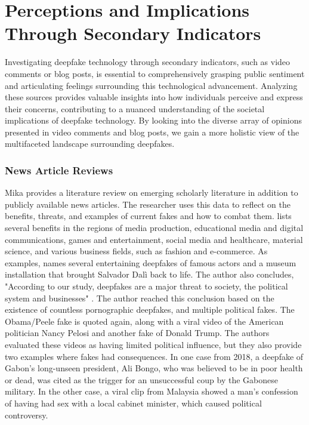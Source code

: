 \documentclass[
  a4paper,  %
  twoside,  %
  bibliography=totoc,
  headsepline,
  cleardoublepage=empty,
  parskip=half,
  draft=false
]{scrbook}
\begin{document}
\section{Perceptions and Implications Through Secondary Indicators} 
\label{sec:rel-secondary}

Investigating deepfake technology through secondary indicators, such as video comments or blog posts, is essential to comprehensively grasping public sentiment and articulating feelings surrounding this technological advancement. Analyzing these sources provides valuable insights into how individuals perceive and express their concerns, contributing to a nuanced understanding of the societal implications of deepfake technology. By looking into the diverse array of opinions presented in video comments and blog posts, we gain a more holistic view of the multifaceted landscape surrounding deepfakes.

\subsubsection*{News Article Reviews}
Mika \citeauthor{westerlundEmergenceDeepfakeTechnology2019a} provides a literature review on emerging scholarly literature in addition to publicly available news articles. The researcher uses this data to reflect on the benefits, threats, and examples of current fakes and how to combat them. \citeauthor{westerlundEmergenceDeepfakeTechnology2019a} lists several benefits in the regions of media production, educational media and digital communications, games and entertainment, social media and healthcare, material science, and various business fields, such as fashion and e-commerce. As examples, \citeauthor{westerlundEmergenceDeepfakeTechnology2019a} names several entertaining deepfakes of famous actors and a museum installation that brought Salvador Dalì back to life. The author also concludes, "According to our study, deepfakes are a major threat to society, the political system and businesses" \cite{westerlundEmergenceDeepfakeTechnology2019a}. The author reached this conclusion based on the existence of countless pornographic deepfakes, and multiple political fakes. The Obama/Peele fake is quoted again, along with a viral video of the American politician Nancy Pelosi and another fake of Donald Trump. The authors evaluated these videos as having limited political influence, but they also provide two examples where fakes had consequences. In one case from 2018, a deepfake of Gabon's long-unseen president, Ali Bongo, who was believed to be in poor health or dead, was cited as the trigger for an unsuccessful coup by the Gabonese military. In the other case, a viral clip from Malaysia showed a man's confession of having had sex with a local cabinet minister, which caused political controversy.
\end{document}
